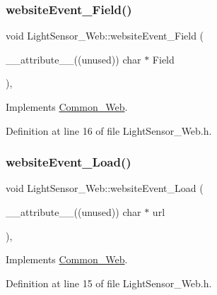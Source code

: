 \subsubsection{\texorpdfstring{website\+Event\+\_\+\+Field()}{websiteEvent\_Field()}}
{\footnotesize\ttfamily void Light\+Sensor\+\_\+\+Web\+::website\+Event\+\_\+\+Field (\begin{DoxyParamCaption}\item[{\+\_\+\+\_\+attribute\+\_\+\+\_\+((unused)) char $\ast$}]{Field }\end{DoxyParamCaption})\hspace{0.3cm}{\ttfamily [inline]}, {\ttfamily [virtual]}}



Implements \hyperlink{class_common___web_a898e3fd8cc6384ecbbbd79c8a3a13b62}{Common\+\_\+\+Web}.



Definition at line 16 of file Light\+Sensor\+\_\+\+Web.\+h.

\mbox{\label{class_light_sensor___web_ac69aec904a72b3c37e9895f6e1d5a848}} 
\subsubsection{\texorpdfstring{website\+Event\+\_\+\+Load()}{websiteEvent\_Load()}}
{\footnotesize\ttfamily void Light\+Sensor\+\_\+\+Web\+::website\+Event\+\_\+\+Load (\begin{DoxyParamCaption}\item[{\+\_\+\+\_\+attribute\+\_\+\+\_\+((unused)) char $\ast$}]{url }\end{DoxyParamCaption})\hspace{0.3cm}{\ttfamily [inline]}, {\ttfamily [virtual]}}



Implements \hyperlink{class_common___web_a5ce0d5ce6f63279c3b624371d8a76211}{Common\+\_\+\+Web}.



Definition at line 15 of file Light\+Sensor\+\_\+\+Web.\+h.

\mbox{\label{class_light_sensor___web_a6afe75f4f6cec3dc5f44454e23da1f8a}} 
